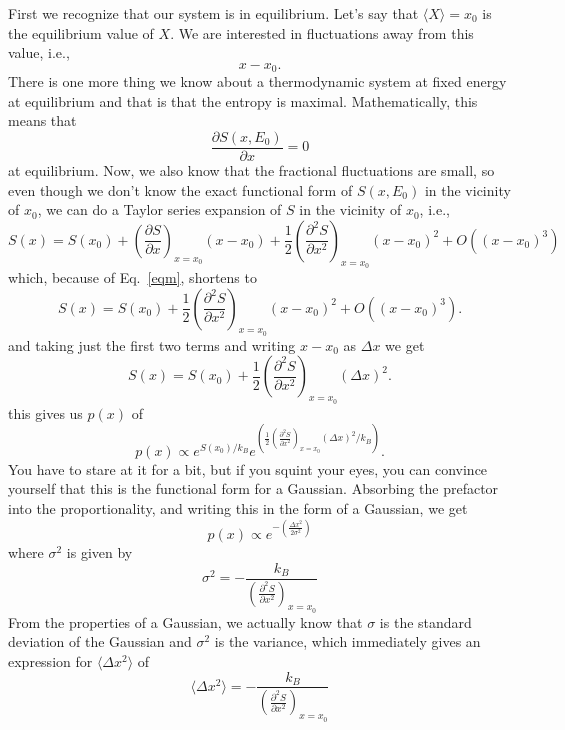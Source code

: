 \documentclass[]{revtex4}
\newcommand{\sm}[1]{{\[#1\]}}
\begin{document}
First we recognize that our system is in equilibrium.  Let's say that $\langle X\rangle = x_0$ is the equilibrium value of $X$.  We are interested in fluctuations
away from this value, i.e.,
\sm{x-x_0.}
There is one more thing we know about a thermodynamic system at fixed energy at equilibrium and that is that the entropy is maximal.  Mathematically, this
means that
\sm{\frac{\partial S(x,E_0)}{\partial x}=0\label{eqm}}
at equilibrium.  Now, we also know that the fractional fluctuations are small, so even though we don't know the exact functional form of $S(x,E_0)$ in the
vicinity of $x_0$, we can do a Taylor series expansion of $S$ in the vicinity of $x_0$, i.e.,
\sm{S(x) = S(x_0)+\left(\frac{\partial S}{\partial x}\right)_{x=x_0}(x-x_0)+\frac{1}{2}\left(\frac{\partial^2 S}{\partial x^2}\right)_{x=x_0}(x-x_0)^2+O((x-x_0)^3)}
which, because of Eq.~\ref{eqm}, shortens to
\sm{S(x) = S(x_0)+\frac{1}{2}\left(\frac{\partial^2 S}{\partial x^2}\right)_{x=x_0}(x-x_0)^2+O((x-x_0)^3).}
and taking just the first two terms and writing $x-x_0$ as $\Delta x$ we get
\sm{S(x) = S(x_0)+\frac{1}{2}\left(\frac{\partial^2 S}{\partial x^2}\right)_{x=x_0}(\Delta x)^2.}
this gives us $p(x)$ of
\sm{p(x) \propto e^{S(x_0)/k_B}e^{\left(\frac{1}{2}\left(\frac{\partial^2 S}{\partial x^2}\right)_{x=x_0}(\Delta x)^2/k_B\right)}.}
You have to stare at it for a bit, but if you squint your eyes, you can convince yourself that this is the functional form for a Gaussian.
Absorbing the prefactor into the proportionality, and writing this in the form of a Gaussian, we get
\sm{p(x) \propto e^{-(\frac{\Delta x^2}{2\sigma^2})}}
where $\sigma^2$ is given by
\sm{\sigma^2 = -\frac{k_B}{\left(\frac{\partial^2 S}{\partial x^2}\right)_{x=x_0}}}
From the properties of a Gaussian, we actually know that $\sigma$ is the standard deviation of the Gaussian
and $\sigma^2$ is the variance, which immediately gives an expression for $\langle \Delta x^2\rangle$ of
\sm{\langle \Delta x^2\rangle=-\frac{k_B}{\left(\frac{\partial^2 S}{\partial x^2}\right)_{x=x_0}}\label{deltax}}
\end{document}
